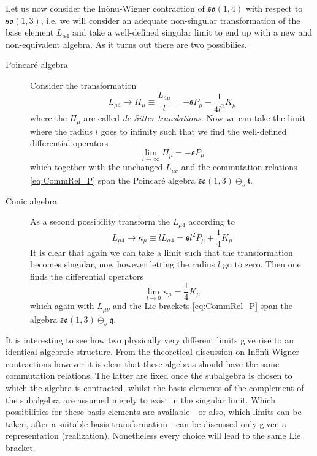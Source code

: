 \documentclass[10pt]{article}
\newcommand{\mfrak}{\mathfrak}
\newcommand{\sfr}{\mathfrak{s}}
\begin{document}
Let us now consider the In\"onu-Wigner contraction of $\mathfrak{so}(1,4)$ with 
respect to $\mfrak{so}(1,3)$, i.e. we will consider an adequate non-singular 
transformation of the base element $L_{\alpha 4}$ and take a well-defined 
singular limit to end up with a new and non-equivalent algebra. As it turns out 
there are two possibilies.
%
\begin{description}
  \item[Poincar\'e algebra]
    Consider the transformation
    \begin{equation}
      L_{\mu4} \rightarrow \Pi_\mu \equiv \frac{L_{4 \mu}}{l} = -\sfr P_\mu - 
      \frac{1}{4l^2} K_\mu
    \end{equation}
    where the $\Pi_\mu$ are called \emph{de Sitter translations}.
    Now we can take the limit where the radius $l$ goes to infinity such that we 
    find the well-defined differential operators
    \begin{equation}
      \lim_{l\rightarrow \infty} \Pi_\mu = -\sfr P_\mu
    \end{equation}
    which together with the unchanged $L_{\mu\nu}$ and the commutation relations 
    \eqref{eq:CommRel_P} span the Poincar\'e algebra 
    $\mfrak{so}(1,3)\oplus_{s}\mfrak{t}$.
  \item[Conic algebra]
    As a second possibility transform the $L_{\mu4}$ according to
    \begin{equation}
      L_{\mu4} \rightarrow \kappa_\mu \equiv l L_{\alpha4} = \sfr l^2 P_\mu + 
      \frac{1}{4}K_\mu
    \end{equation}
    It is clear that again we can take a limit such that the transformation 
    becomes singular, now however letting the radius $l$ go to zero. Then one 
    finds the differential operators
    \begin{equation}
      \lim_{l\rightarrow 0} \kappa_\mu = \frac{1}{4}K_\mu
    \end{equation}
    which again with $L_{\mu\nu}$ and the Lie brackets \eqref{eq:CommRel_P} span 
    the algebra $\mfrak{so}(1,3)\oplus_{s}\mfrak{q}$.
\end{description}

It is interesting to see how two physically very different limits give rise to 
an identical algebraic structure. From the theoretical discussion on 
In\"on\"u-Wigner contractions however it is clear that these algebras should 
have the same commutation relations. The latter are fixed once the subalgebra is 
chosen to which the algebra is contracted, whilst the basis elements of the 
complement of the subalgebra are assumed merely to exist in the singular limit.  
Which possibilities for these basis elements are available---or also, which 
limits can be taken, after a suitable basis transformation---can be discussed 
only given a representation (realization). Nonetheless every choice will lead to 
the same Lie bracket.
\end{document}
